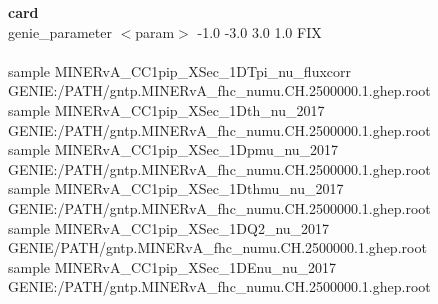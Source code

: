 \documentclass[usenames,dvipsnames]{beamer}
\begin{document}
\begin{frame}
\textbf{card}\\
\tiny{
	genie\_parameter $<$param$>$  -1.0  -3.0  3.0  1.0  FIX\\~\\
	
	sample MINERvA\_CC1pip\_XSec\_1DTpi\_nu\_fluxcorr GENIE:/PATH/gntp.MINERvA\_fhc\_numu.CH.2500000.1.ghep.root\\
	sample MINERvA\_CC1pip\_XSec\_1Dth\_nu\_2017 GENIE:/PATH/gntp.MINERvA\_fhc\_numu.CH.2500000.1.ghep.root\\
	sample MINERvA\_CC1pip\_XSec\_1Dpmu\_nu\_2017 GENIE:/PATH/gntp.MINERvA\_fhc\_numu.CH.2500000.1.ghep.root\\
	sample MINERvA\_CC1pip\_XSec\_1Dthmu\_nu\_2017 GENIE:/PATH/gntp.MINERvA\_fhc\_numu.CH.2500000.1.ghep.root\\
	sample MINERvA\_CC1pip\_XSec\_1DQ2\_nu\_2017 GENIE/PATH/gntp.MINERvA\_fhc\_numu.CH.2500000.1.ghep.root\\
	sample MINERvA\_CC1pip\_XSec\_1DEnu\_nu\_2017 GENIE:/PATH/gntp.MINERvA\_fhc\_numu.CH.2500000.1.ghep.root\\
}	
\end{frame}
\end{document}
